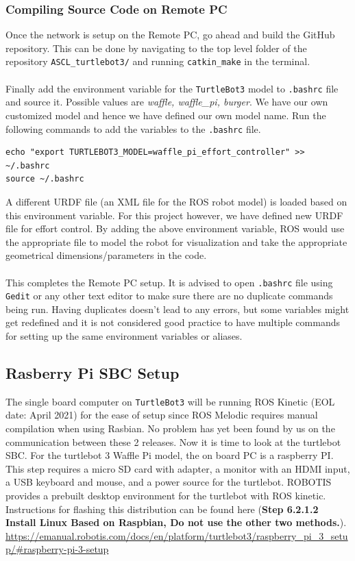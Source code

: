 \documentclass[12]{article}
\begin{document}
\subsubsection{Compiling Source Code on Remote PC}
Once the network is setup on the Remote PC, go ahead and build the GitHub repository. This can be done by navigating to the top level folder of the repository \texttt{ASCL\_turtlebot3/} and running \texttt{catkin\_make} in the terminal.\\\\
Finally add the environment variable for the \texttt{TurtleBot3} model to \texttt{.bashrc} file and source it. Possible values are \textit{waffle, waffle\_pi, burger}. We have our own customized model and hence we have defined our own model name. Run the following commands to add the variables to the \texttt{.bashrc} file.
\begin{lstlisting}[style=bash]
echo "export TURTLEBOT3_MODEL=waffle_pi_effort_controller" >> ~/.bashrc
source ~/.bashrc
\end{lstlisting}
A different URDF file (an XML file for the ROS robot model) is loaded based on this environment variable. For this project however, we have defined new URDF file for effort control. By adding the above environment variable, ROS would use the appropriate file to model the robot for visualization and take the appropriate geometrical dimensions/parameters in the code.\\\\
This completes the Remote PC setup. It is advised to open \texttt{.bashrc} file using \texttt{Gedit} or any other text editor to make sure there are no duplicate commands being run. Having duplicates doesn't lead to any errors, but some variables might get redefined and it is not considered good practice to have multiple commands for setting up the same environment variables or aliases.
\subsection{Rasberry Pi SBC Setup}
The single board computer on \texttt{TurtleBot3} will be running ROS Kinetic (EOL date: April 2021) for the ease of setup since ROS Melodic requires manual compilation when using Rasbian. 
No problem has yet been found by us on the communication between these 2 releases.
Now it is time to look at the turtlebot SBC. For the turtlebot 3 Waffle Pi model, the on board PC is a raspberry PI. 
This step requires a micro SD card with adapter, a monitor with an HDMI input, a USB keyboard and mouse, and a power source for the turtlebot. 
ROBOTIS provides a prebuilt desktop environment for the turtlebot with ROS kinetic. Instructions for flashing this distribution can be found here (\textbf{Step 6.2.1.2 Install Linux Based on Raspbian, Do not use the other two methods.}).\\
\url {https://emanual.robotis.com/docs/en/platform/turtlebot3/raspberry_pi_3_setup/#raspberry-pi-3-setup}
\end{document}
